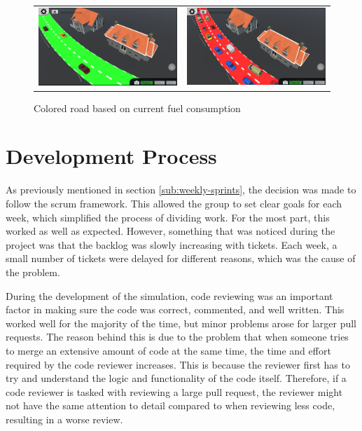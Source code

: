     \begin{figure}[H]
        \begin{tabular}{cc}
            \includegraphics[width=0.48\linewidth]{Project_report/figures/method/green road.png} & 
            \includegraphics[width=0.48\linewidth]{Project_report/figures/method/red road.png} \\
        \end{tabular}
        \caption{Colored road based on current fuel consumption}
        \label{fig:color-roads}
    \end{figure}
    
    
\section{Development Process}
    As previously mentioned in section \ref{sub:weekly-sprints}, the decision was made to follow the scrum framework. This allowed the group to set clear goals for each week, which simplified the process of dividing work. For the most part, this worked as well as expected. However, something that was noticed during the project was that the backlog was slowly increasing with tickets. Each week, a small number of tickets were delayed for different reasons, which was the cause of the problem. 

    During the development of the simulation, code reviewing was an important factor in making sure the code was correct, commented, and well written. This worked well for the majority of the time, but minor problems arose for larger pull requests. The reason behind this is due to the problem that when someone tries to merge an extensive amount of code at the same time, the time and effort required by the code reviewer increases. This is because the reviewer first has to try and understand the logic and functionality of the code itself. Therefore, if a code reviewer is tasked with reviewing a large pull request, the reviewer might not have the same attention to detail compared to when reviewing less code, resulting in a worse review.


